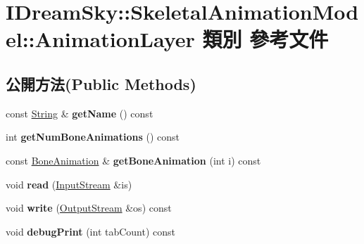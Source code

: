 \hypertarget{class_i_dream_sky_1_1_skeletal_animation_model_1_1_animation_layer}{}\section{I\+Dream\+Sky\+:\+:Skeletal\+Animation\+Model\+:\+:Animation\+Layer 類別 參考文件}
\label{class_i_dream_sky_1_1_skeletal_animation_model_1_1_animation_layer}
\subsection*{公開方法(Public Methods)}
\begin{DoxyCompactItemize}
\item 
const \hyperlink{class_i_dream_sky_1_1_string}{String} \& {\bfseries get\+Name} () const \hypertarget{class_i_dream_sky_1_1_skeletal_animation_model_1_1_animation_layer_acc395f1d61641347208ccd4d03a07032}{}\label{class_i_dream_sky_1_1_skeletal_animation_model_1_1_animation_layer_acc395f1d61641347208ccd4d03a07032}

\item 
int {\bfseries get\+Num\+Bone\+Animations} () const \hypertarget{class_i_dream_sky_1_1_skeletal_animation_model_1_1_animation_layer_a8bd587558162795ad93b6eb8120ced20}{}\label{class_i_dream_sky_1_1_skeletal_animation_model_1_1_animation_layer_a8bd587558162795ad93b6eb8120ced20}

\item 
const \hyperlink{class_i_dream_sky_1_1_skeletal_animation_model_1_1_bone_animation}{Bone\+Animation} \& {\bfseries get\+Bone\+Animation} (int i) const \hypertarget{class_i_dream_sky_1_1_skeletal_animation_model_1_1_animation_layer_a4b2df1e179ac4af824e53480bb5fc4cf}{}\label{class_i_dream_sky_1_1_skeletal_animation_model_1_1_animation_layer_a4b2df1e179ac4af824e53480bb5fc4cf}

\item 
void {\bfseries read} (\hyperlink{class_i_dream_sky_1_1_input_stream}{Input\+Stream} \&is)\hypertarget{class_i_dream_sky_1_1_skeletal_animation_model_1_1_animation_layer_a69ffa9eabb1e01577d18039f57d24bdf}{}\label{class_i_dream_sky_1_1_skeletal_animation_model_1_1_animation_layer_a69ffa9eabb1e01577d18039f57d24bdf}

\item 
void {\bfseries write} (\hyperlink{class_i_dream_sky_1_1_output_stream}{Output\+Stream} \&os) const \hypertarget{class_i_dream_sky_1_1_skeletal_animation_model_1_1_animation_layer_a365011c7d9eff13f11d7cf163e49d9d9}{}\label{class_i_dream_sky_1_1_skeletal_animation_model_1_1_animation_layer_a365011c7d9eff13f11d7cf163e49d9d9}

\item 
void {\bfseries debug\+Print} (int tab\+Count) const \hypertarget{class_i_dream_sky_1_1_skeletal_animation_model_1_1_animation_layer_a86b18540ea36ae8e2b8d59570f22eb85}{}\label{class_i_dream_sky_1_1_skeletal_animation_model_1_1_animation_layer_a86b18540ea36ae8e2b8d59570f22eb85}

\end{DoxyCompactItemize}
